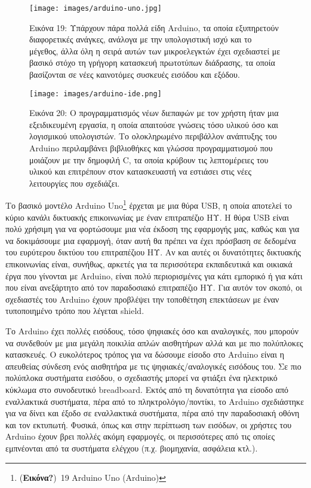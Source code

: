 \documentclass[
]{article}
\begin{document}
\leavevmode{}%
\begin{figure}
\hypertarget{fig:arduino-uno}{%
\centering
\texttt{[image: images/arduino-uno.jpg]}
\caption{Εικόνα 19: Υπάρχουν πάρα πολλά είδη Arduino, τα οποία
εξυπηρετούν διαφορετικές ανάγκες, ανάλογα με την υπολογιστική ισχύ και
το μέγεθος, άλλα όλη η σειρά αυτών των μικροελεγκτών έχει σχεδιαστεί με
βασικό στόχο τη γρήγορη κατασκευή πρωτοτύπων διάδρασης, τα οποία
βασίζονται σε νέες καινοτόμες συσκευές εισόδου και
εξόδου.}\label{fig:arduino-uno}
}
\end{figure}

\leavevmode{}%
\begin{figure}
\hypertarget{fig:arduino-ide}{%
\centering
\texttt{[image: images/arduino-ide.png]}
\caption{Εικόνα 20: Ο προγραμματισμός νέων διεπαφών με τον χρήστη ήταν
μια εξειδικευμένη εργασία, η οποία απαιτούσε γνώσεις τόσο υλικού όσο και
λογισμικού υπολογιστών. Το ολοκληρωμένο περιβάλλον ανάπτυξης του Arduino
περιλαμβάνει βιβλιοθήκες και γλώσσα προγραμματισμού που μοιάζουν με την
δημοφιλή C, τα οποία κρύβουν τις λεπτομέρειες του υλικού και επιτρέπουν
στον κατασκευαστή να εστιάσει στις νέες λειτουργίες που
σχεδιάζει.}\label{fig:arduino-ide}
}
\end{figure}

Το βασικό μοντέλο Arduino Uno\footnote{(\textbf{Εικόνα?})~19 Arduino Uno
  (Arduino)} έρχεται με μια θύρα USB, η οποία αποτελεί το κύριο κανάλι
δικτυακής επικοινωνίας με έναν επιτραπέζιο ΗΥ. Η θύρα USB είναι πολύ
χρήσιμη για να φορτώσουμε μια νέα έκδοση της εφαρμογής μας, καθώς και
για να δοκιμάσουμε μια εφαρμογή, όταν αυτή θα πρέπει να έχει πρόσβαση σε
δεδομένα του ευρύτερου δικτύου του επιτραπέζιου ΗΥ. Αν και αυτές οι
δυνατότητες δικτυακής επικοινωνίας είναι, συνήθως, αρκετές για τα
περισσότερα εκπαιδευτικά και οικιακά έργα που γίνονται με Arduino, είναι
πολύ περιορισμένες για κάτι εμπορικό ή για κάτι που είναι ανεξάρτητο από
τον παραδοσιακό επιτραπέζιο ΗΥ. Για αυτόν τον σκοπό, οι σχεδιαστές του
Arduino έχουν προβλέψει την τοποθέτηση επεκτάσεων με έναν τυποποιημένο
τρόπο που λέγεται shield.

Το Arduino έχει πολλές εισόδους, τόσο ψηφιακές όσο και αναλογικές, που
μπορούν να συνδεθούν με μια μεγάλη ποικιλία απλών αισθητήρων αλλά και με
πιο πολύπλοκες κατασκευές. Ο ευκολότερος τρόπος για να δώσουμε είσοδο
στο Arduino είναι η απευθείας σύνδεση ενός αισθητήρα με τις
ψηφιακές/αναλογικές εισόδους του. Σε πιο πολύπλοκα συστήματα εισόδου, ο
σχεδιαστής μπορεί να φτιάξει ένα ηλεκτρικό κύκλωμα στο συνοδευτικό
breadboard. Εκτός από τη δυνατότητα για είσοδο από εναλλακτικά
συστήματα, πέρα από το πληκτρολόγιο/ποντίκι, το Arduino σχεδιάστηκε για
να δίνει και έξοδο σε εναλλακτικά συστήματα, πέρα από την παραδοσιακή
οθόνη και τον εκτυπωτή. Φυσικά, όπως και στην περίπτωση των εισόδων, οι
χρήστες του Arduino έχουν βρει πολλές ακόμη εφαρμογές, οι περισσότερες
από τις οποίες εμπνέονται από τα συστήματα ελέγχου (π.χ. βιομηχανία,
ασφάλεια κτλ.).
\end{document}
